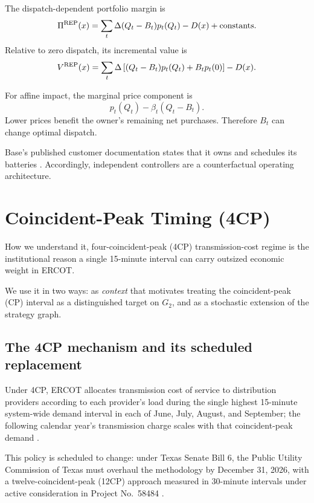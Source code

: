 \documentclass[11pt]{article}
\theoremstyle{remark}
\begin{document}
The dispatch-dependent portfolio margin is
\begin{equation}
 \Pi^{\rm REP}(x)=\sum_t\Delta(Q_t-B_t)p_t(Q_t)-D(x)
                    +\text{constants}.
 \label{eq:rep}
\end{equation}
Relative to zero dispatch, its incremental value is
\begin{equation}
 V^{\rm REP}(x)=\sum_t\Delta\left[(Q_t-B_t)p_t(Q_t)+B_tp_t(0)\right]-D(x).
 \label{eq:repvalue}
\end{equation}

For affine impact, the marginal price component is
\begin{equation}
 p_t(Q_t)-\beta_t(Q_t-B_t).
 \label{eq:repmarginal}
\end{equation}
Lower prices benefit the owner's remaining net purchases. Therefore
$B_t$ can change optimal dispatch. 

Base's published customer documentation states that it owns and schedules
its batteries \cite{base}. Accordingly, independent controllers are a
counterfactual operating architecture.

\section{Coincident-Peak Timing (4CP)}
\label{sec:cp}

How we understand it, four-coincident-peak (4CP) transmission-cost regime is the institutional
reason a single 15-minute interval can carry outsized economic weight in
ERCOT. 

We use it in two ways: as \emph{context} that motivates treating the
coincident-peak (CP) interval as a distinguished target on $G_2$, and as a
stochastic extension of the strategy graph. 

\subsection{The 4CP mechanism and its scheduled replacement}
Under 4CP, ERCOT allocates transmission cost of service to distribution
providers according to each provider's load during the single highest
15-minute system-wide demand interval in each of June, July, August, and
September; the following calendar year's transmission charge scales with that
coincident-peak demand \cite{ercot4cp,rtoinsider}. 

This policy is scheduled to change:
under Texas Senate Bill 6, the Public Utility Commission of Texas must overhaul
the methodology by December 31, 2026, with a twelve-coincident-peak (12CP)
approach measured in 30-minute intervals under active consideration in Project
No.~58484 \cite{sb6reform,rtoinsider}. 
\end{document}

